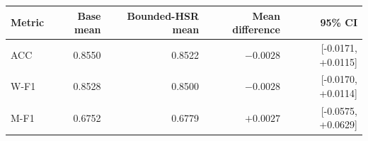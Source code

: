 \begin{tabular}{lrrrr}
\toprule
Metric & Base mean & Bounded-HSR mean & Mean difference & 95\% CI \\
\midrule
ACC & 0.8550 & 0.8522 & $-0.0028$ & [-0.0171, +0.0115] \\
W-F1 & 0.8528 & 0.8500 & $-0.0028$ & [-0.0170, +0.0114] \\
M-F1 & 0.6752 & 0.6779 & $+0.0027$ & [-0.0575, +0.0629] \\
\bottomrule
\end{tabular}

